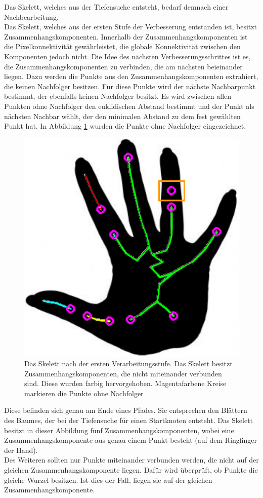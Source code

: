 Das Skelett, welches aus der Tiefensuche entsteht, bedarf demnach einer Nachbearbeitung. \\
Das Skelett, welches aus der ersten Stufe der Verbesserung entstanden ist, besitzt Zusammenhangskomponenten. Innerhalb der Zusammenhangskomponenten ist die Pixelkonnektivität gewährleistet, die globale Konnektivität zwischen den Komponenten jedoch nicht. Die Idee des
nächsten Verbesserungsschrittes ist es, die Zusammenhangskomponenten
zu verbinden, die am nächsten beieinander liegen. Dazu werden
die Punkte aus den Zusammenhangskomponenten extrahiert, die
keinen Nachfolger besitzen. 
Für diese Punkte wird der nächste Nachbarpunkt bestimmt, der
ebenfalls keinen Nachfolger besitzt. Es wird zwischen allen Punkten ohne Nachfolger den euklidischen Abstand bestimmt und der Punkt als nächsten Nachbar wählt, der den minimalen Abstand zu dem fest gewählten Punkt hat. In Abbildung \ref{fig:hand-punkte-ohne-nachfolger} wurden die Punkte ohne Nachfolger eingezeichnet. 
\begin{figure}[htbp]
\centering
\includegraphics[width=0.4\linewidth]{./fig/zhks_gefaerbt}
\caption{Das Skelett nach der ersten Verarbeitungsstufe. Das Skelett besitzt Zusammenhangskomponenten, die nicht 
miteinander verbunden sind. Diese wurden farbig hervorgehoben. Magentafarbene Kreise markieren die Punkte ohne Nachfolger}
\label{fig:hand-punkte-ohne-nachfolger}
\end{figure}
Diese befinden sich genau am Ende eines Pfades. Sie entsprechen den Blättern des Baumes, der bei der Tiefensuche für einen Startknoten entsteht. Das Skelett besitzt in dieser Abbildung fünf Zusammenhangskomponenten,
wobei eine Zusammenhangskomponente aus genau einem Punkt besteht
(auf dem Ringfinger der Hand).\\
Des Weiteren sollten nur Punkte miteinander verbunden werden, die
nicht auf der gleichen Zusammenhangskomponente liegen. Dafür wird
überprüft, ob Punkte die gleiche Wurzel besitzen. Ist dies der 
Fall, liegen sie auf der gleichen Zusammenhangskomponente. \\
